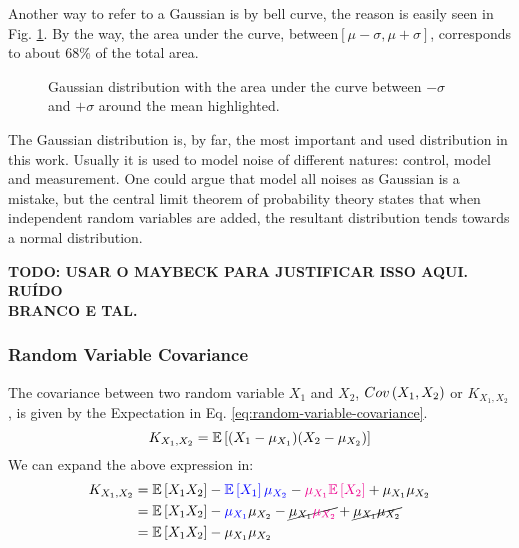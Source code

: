 \documentclass[12pt]{article}
\begin{document}
Another way to refer to a Gaussian is by bell curve, the reason is easily seen in Fig. \ref{fig:guassian-curve}. By the way, the area under the curve, between$\left[\mu-\sigma, \mu+\sigma\right]$, corresponds to about $68\%$ of the total area.

\begin{figure}[h]
    \centering
    
    \caption{Gaussian distribution with the area under the curve between $-\sigma$ and $+\sigma$ around the mean highlighted.}
    \label{fig:guassian-curve}
\end{figure}

The Gaussian distribution is, by far, the most important and used distribution in this work. Usually it is used to model noise of different natures: control, model and measurement. One could argue that model all noises as Gaussian is a mistake, but the central limit theorem of probability theory states that when independent random variables are added, the resultant distribution tends towards a normal distribution.

\color{magenta}
\textbf{TODO: USAR O MAYBECK PARA JUSTIFICAR ISSO AQUI. RUÍDO \\BRANCO E TAL.}
\color{black}

\subsubsection{Random Variable Covariance}
The covariance between two random variable $X_1$ and $X_2$, $\mathop{Cov}\left(X_1, X_2\right)$ or $K_{X_1, X_2}$, is given by the Expectation in Eq. \ref{eq:random-variable-covariance}.
\begin{equation}
    K_{X_1, X_2} = \mathbb{E}\left[(X_1 - \mu_{X_1})(X_2 - \mu_{X_2})\right]
    \label{eq:random-variable-covariance}
\end{equation}
We can expand the above expression in:
\begin{equation}
\begin{aligned}
    K_{X_1, X_2} &= \mathbb{E}\left[X_1 X_2\right] - \color{blue}\mathbb{E}\left[X_1\right]\mu_{X_2}\color{black} - \color{magenta}\mu_{X_1}\mathbb{E}\left[X_2\right]\color{black} + \mu_{X_1} \mu_{X_2}\\
    &= \mathbb{E}\left[X_1 X_2\right] - \color{blue}\mu_{X_1}\color{black}\mu_{X_2} - \cancel{\mu_{X_1}\color{magenta}\mu_{X_2}\color{black}} + \cancel{\mu_{X_1} \mu_{X_2}}\\
    &= \mathbb{E}\left[X_1 X_2\right] - \mu_{X_1}\mu_{X_2}
\end{aligned}
    \label{eq:random-variable-covariance-expanded}
\end{equation}
\end{document}
